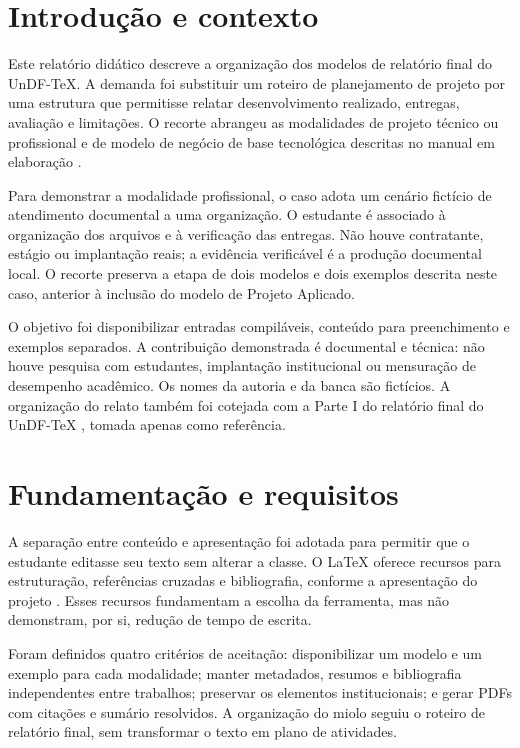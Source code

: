 \chapter{Introdução e contexto}
Este relatório didático descreve a organização dos modelos de relatório final
do UnDF-TeX. A demanda foi substituir um roteiro de planejamento de projeto
por uma estrutura que permitisse relatar desenvolvimento realizado, entregas,
avaliação e limitações. O recorte abrangeu as modalidades de projeto técnico
ou profissional e de modelo de negócio de base tecnológica descritas no
manual em elaboração .

Para demonstrar a modalidade profissional, o caso adota um cenário fictício
de atendimento documental a uma organização. O estudante é associado à
organização dos arquivos e à verificação das entregas. Não houve contratante,
estágio ou implantação reais; a evidência verificável é a produção documental
local. O recorte preserva a etapa de dois modelos e dois exemplos descrita
neste caso, anterior à inclusão do modelo de Projeto Aplicado.

O objetivo foi disponibilizar entradas compiláveis, conteúdo para preenchimento
e exemplos separados. A contribuição demonstrada é documental e técnica:
não houve pesquisa com estudantes, implantação institucional ou mensuração
de desempenho acadêmico. Os nomes da autoria e da banca são fictícios.
A organização do relato também foi cotejada com a Parte I do relatório
final do UnDF-TeX , tomada apenas como referência.

\chapter{Fundamentação e requisitos}
A separação entre conteúdo e apresentação foi adotada para permitir que o
estudante editasse seu texto sem alterar a classe. O LaTeX oferece recursos
para estruturação, referências cruzadas e bibliografia, conforme a apresentação
do projeto . Esses recursos fundamentam a escolha da
ferramenta, mas não demonstram, por si, redução de tempo de escrita.

Foram definidos quatro critérios de aceitação: disponibilizar um modelo e
um exemplo para cada modalidade; manter metadados, resumos e bibliografia
independentes entre trabalhos; preservar os elementos institucionais; e
gerar PDFs com citações e sumário resolvidos. A organização do miolo seguiu
o roteiro de relatório final, sem transformar o texto em plano de atividades.

